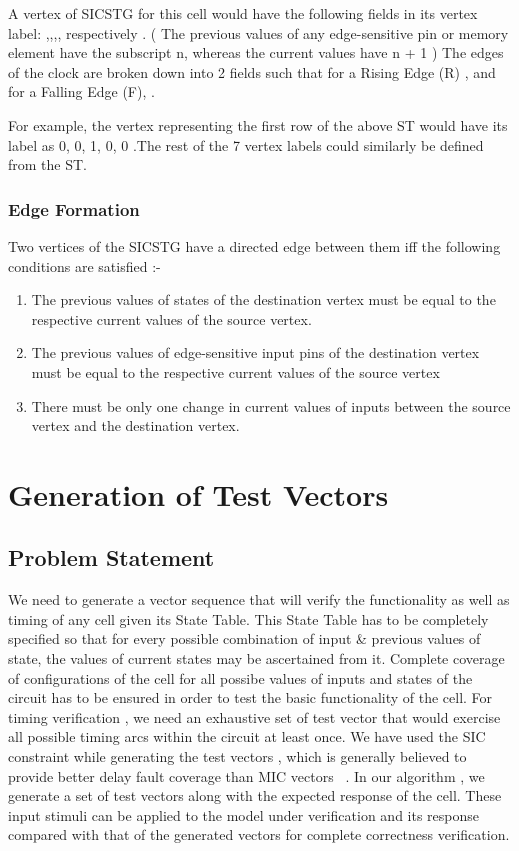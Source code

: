 \documentclass[final]{ieee}
\begin{document}
A vertex of SICSTG for this cell would have the following fields in its vertex label: ,,,, respectively . ( The previous values of any edge-sensitive pin or memory element have the subscript n, whereas the current values have n + 1 ) The edges of the clock are broken down into 2 fields such that for a Rising Edge (R) ,  and for a Falling Edge (F), .

For example, the vertex representing the first row of the above ST would have its label as 0, 0, 1, 0, 0 .The rest of the 7 vertex labels could similarly be defined from the ST.

\subsubsection{Edge Formation}
\label{edge_defn}
Two vertices of the SICSTG have a directed edge between them iff the following conditions are satisfied :-
\begin{enumerate}
 \item The previous values of states of the destination vertex must be equal to the respective current values of the source vertex.
 \item The previous values of edge-sensitive input pins of the destination vertex must be equal to the respective current values of the source vertex
 \item There must be only one change in current values of inputs between the source vertex and the destination vertex.
\end{enumerate}

\section{Generation of Test Vectors}
\subsection{Problem Statement}
We need to generate a vector sequence that will verify the functionality as well as timing of any cell given its State Table. This State Table has to be completely specified so that for every possible combination of input \& previous values of state, the values of current states may be ascertained from it. Complete coverage of configurations of the cell for all possibe values of inputs and states of the circuit has to be ensured in order to test the basic functionality of the cell. For timing verification , we need an exhaustive set of test vector that would exercise all possible timing arcs within the circuit at least once. We have used the SIC constraint while generating the test vectors , which is generally believed to provide better delay fault coverage than MIC vectors ~\cite{rsic}. In our algorithm , we generate a set of test vectors along with the expected response of the cell. These input stimuli can be applied to the model under verification and its response compared with that of the generated vectors for complete correctness verification.
\end{document}

